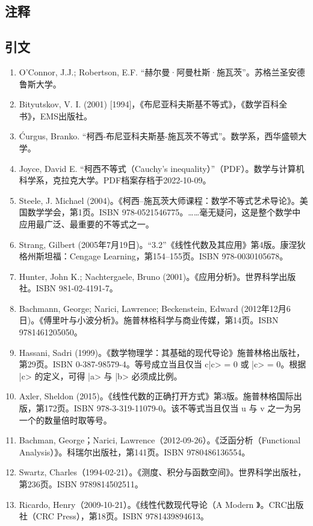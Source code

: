 \subsection{注释}
\subsection{引文}
\begin{enumerate}
\item O'Connor, J.J.; Robertson, E.F. “赫尔曼·阿曼杜斯·施瓦茨”。苏格兰圣安德鲁斯大学。
\item Bityutskov, V. I. (2001) [1994]，《布尼亚科夫斯基不等式》，《数学百科全书》，EMS出版社。
\item Ćurgus, Branko. “柯西-布尼亚科夫斯基-施瓦茨不等式”。数学系，西华盛顿大学。
\item Joyce, David E. “柯西不等式（Cauchy's inequality）”（PDF）。数学与计算机科学系，克拉克大学。PDF档案存档于2022-10-09。
\item Steele, J. Michael (2004)。《柯西–施瓦茨大师课程：数学不等式艺术导论》。美国数学学会，第1页。ISBN 978-0521546775。……毫无疑问，这是整个数学中应用最广泛、最重要的不等式之一。
\item Strang, Gilbert (2005年7月19日)。“3.2”《线性代数及其应用》第4版。康涅狄格州斯坦福：Cengage Learning，第154–155页。ISBN 978-0030105678。
\item Hunter, John K.; Nachtergaele, Bruno (2001)。《应用分析》。世界科学出版社。ISBN 981-02-4191-7。
\item Bachmann, George; Narici, Lawrence; Beckenstein, Edward (2012年12月6日)。《傅里叶与小波分析》。施普林格科学与商业传媒，第14页。ISBN 9781461205050。
\item Hassani, Sadri (1999)。《数学物理学：其基础的现代导论》施普林格出版社，第29页。ISBN 0-387-98579-4。等号成立当且仅当 \<c|c> = 0 或 |c> = 0。根据 |c> 的定义，可得 |a> 与 |b> 必须成比例。
\item Axler, Sheldon (2015)。《线性代数的正确打开方式》第3版。施普林格国际出版，第172页。ISBN 978-3-319-11079-0。该不等式当且仅当 u 与 v 之一为另一个的数量倍时取等号。
\item Bachman, George；Narici, Lawrence（2012-09-26）。《泛函分析（Functional Analysis）》。科瑞尔出版社，第141页。ISBN 9780486136554。
\item Swartz, Charles（1994-02-21）。《测度、积分与函数空间》。世界科学出版社，第236页。ISBN 9789814502511。
\item Ricardo, Henry（2009-10-21）。《线性代数现代导论（A Modern 》。CRC出版社（CRC Press），第18页。ISBN 9781439894613。

\end{enumerate}
